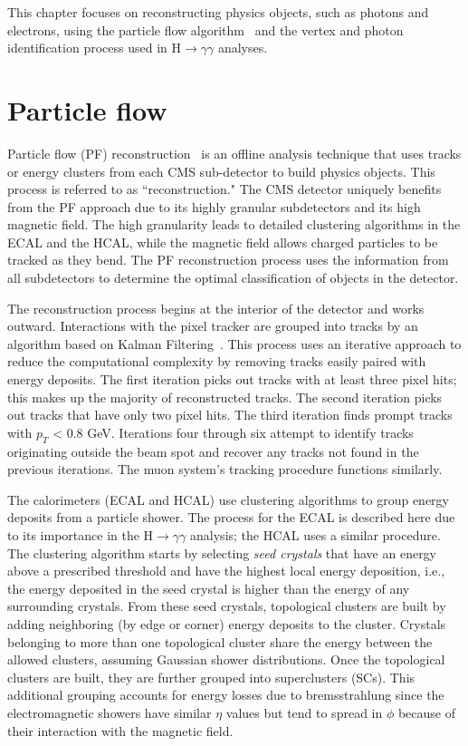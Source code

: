 This chapter focuses on reconstructing physics objects, such as photons and electrons, using the particle flow algorithm~\cite{particle_flow} and the vertex and photon identification process used in H$\rightarrow\gamma\gamma$ analyses. 

\section{Particle flow}

Particle flow (PF) reconstruction~\cite{particle_flow} is an offline analysis technique that uses tracks or energy clusters from each CMS sub-detector to build physics objects. This process is referred to as ``reconstruction." The CMS detector uniquely benefits from the PF approach due to its highly granular subdetectors and its high magnetic field. The high granularity leads to detailed clustering algorithms in the ECAL and the HCAL, while the magnetic field allows charged particles to be tracked as they bend. The PF reconstruction process uses the information from all subdetectors to determine the optimal classification of objects in the detector.

The reconstruction process begins at the interior of the detector and works outward. Interactions with the pixel tracker are grouped into tracks by an algorithm based on Kalman Filtering~\cite{track_reco}. This process uses an iterative approach to reduce the computational complexity by removing tracks easily paired with energy deposits. The first iteration picks out tracks with at least three pixel hits; this makes up the majority of reconstructed tracks. The second iteration picks out tracks that have only two pixel hits. The third iteration finds prompt tracks with $p_T$ < 0.8 GeV. Iterations four through six attempt to identify tracks originating outside the beam spot and recover any tracks not found in the previous iterations. The muon system's tracking procedure functions similarly.

The calorimeters (ECAL and HCAL) use clustering algorithms to group energy deposits from a particle shower. The process for the ECAL is described here due to its importance in the H$\rightarrow\gamma\gamma$ analysis; the HCAL uses a similar procedure. The clustering algorithm starts by selecting \textit{seed crystals} that have an energy above a prescribed threshold and have the highest local energy deposition, i.e., the energy deposited in the seed crystal is higher than the energy of any surrounding crystals. From these seed crystals, topological clusters are built by adding neighboring (by edge or corner) energy deposits to the cluster. Crystals belonging to more than one topological cluster share the energy between the allowed clusters, assuming Gaussian shower distributions. Once the topological clusters are built, they are further grouped into superclusters (SCs). This additional grouping accounts for energy losses due to bremsstrahlung since the electromagnetic showers have similar $\eta$ values but tend to spread in $\phi$ because of their interaction with the magnetic field.

